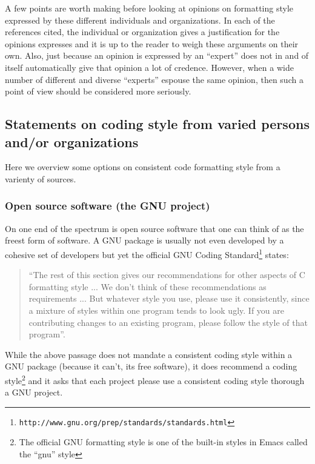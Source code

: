 A few points are worth making before looking at opinions on formatting style
expressed by these different individuals and organizations.  In each of the
references cited, the individual or organization gives a justification for the
opinions expresses and it is up to the reader to weigh these arguments on
their own.  Also, just because an opinion is expressed by an ``expert'' does
not in and of itself automatically give that opinion a lot of credence.
However, when a wide number of different and diverse ``experts'' espouse the
same opinion, then such a point of view should be considered more seriously.


%
\subsection{Statements on coding style from varied persons and/or organizations}
%

Here we overview some options on consistent code formatting style from a
varienty of sources.


%
\subsubsection{Open source software (the GNU project)}
%

On one end of the spectrum is open source software that one can think of as
the freest form of software.  A GNU package is usually not even developed by a
cohesive set of developers but yet the official GNU Coding
Standard\footnote{{}\texttt{http://www.gnu.org/prep/standards/standards.html}}
states:

\begin{quote}

``The rest of this section gives our recommendations for other aspects of C
formatting style ... We don't think of these recommendations as requirements
... But whatever style you use, please use it consistently, since a mixture of
styles within one program tends to look ugly. If you are contributing changes
to an existing program, please follow the style of that program''.

\end{quote}

While the above passage does not mandate a consistent coding style within a
GNU package (because it can't, its free software), it does recommend a coding
style\footnote{The official GNU formatting style is one of the built-in styles
in Emacs called the ``gnu'' style} and it asks that each project please use a
consistent coding style thorough a GNU project.


